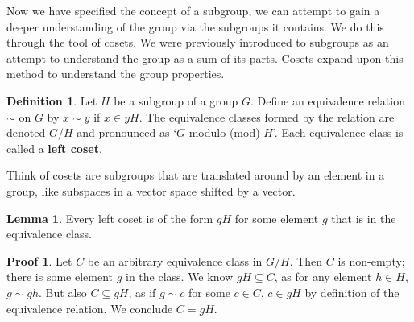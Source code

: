 \documentclass[12pt]{amsbook}
\theoremstyle{definition}
\newtheorem{lemma}[theorem]{Lemma}
\newtheorem{definition}{Definition}
\newtheorem*{prf}{Proof}
\newcommand{\gen}[1]{\langle #1 \rangle} %
\begin{document}
\begin{center}
\end{center}

Now we have specified the concept of a subgroup, we can attempt to gain a deeper understanding of the group via the subgroups it contains. We do this through the tool of cosets. We were previously introduced to subgroups as an attempt to understand the group as a sum of its parts. Cosets expand upon this method to understand the group properties.

\begin{definition}
    Let $H$ be a subgroup of a group $G$. Define an equivalence relation $\sim$ on $G$ by $x \sim y$ if $x \in yH$. The equivalence classes formed by the relation are denoted $G/H$ and pronounced as `$G$ modulo (mod) $H$'. Each equivalence class is called a {\bf left coset}. 
\end{definition}

Think of cosets are subgroups that are translated around by an element in a group, like subspaces in a vector space shifted by a vector.

\begin{lemma}
    Every left coset is of the form $gH$ for some element $g$ that is in the equivalence class.
\end{lemma}
\begin{prf}
    Let $C$ be an arbitrary equivalence class in $G/H$. Then $C$ is non-empty; there is some element $g$ in the class. We know $gH \subseteq C$, as for any element $h \in H$, $g \sim gh$. But also $C \subseteq gH$, as if $g \sim c$ for some $c \in C$, $c \in gH$ by definition of the equivalence relation. We conclude $C = gH$.
\end{prf}
\end{document}
